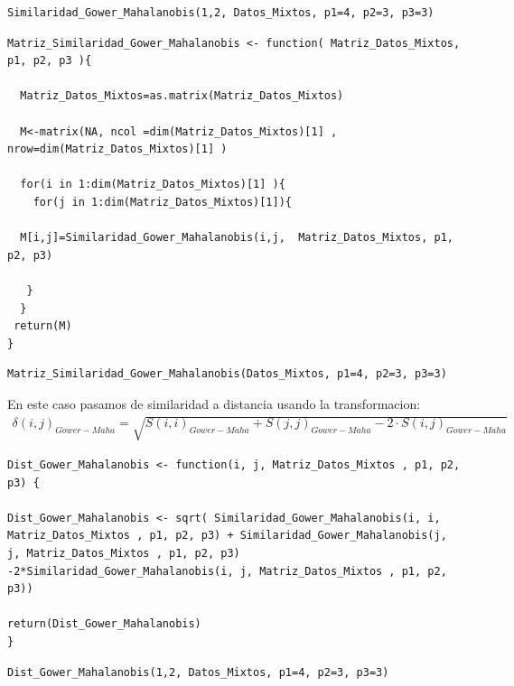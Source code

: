\documentclass[12pt]{report} %
\begin{document}
 
\vspace{1cm}
 

\begin{lstlisting}
Similaridad_Gower_Mahalanobis(1,2, Datos_Mixtos, p1=4, p2=3, p3=3)
\end{lstlisting}


\begin{lstlisting}
Matriz_Similaridad_Gower_Mahalanobis <- function( Matriz_Datos_Mixtos, p1, p2, p3 ){
  
  Matriz_Datos_Mixtos=as.matrix(Matriz_Datos_Mixtos)
  
  M<-matrix(NA, ncol =dim(Matriz_Datos_Mixtos)[1] , nrow=dim(Matriz_Datos_Mixtos)[1] )
  
  for(i in 1:dim(Matriz_Datos_Mixtos)[1] ){
    for(j in 1:dim(Matriz_Datos_Mixtos)[1]){
    
  M[i,j]=Similaridad_Gower_Mahalanobis(i,j,  Matriz_Datos_Mixtos, p1, p2, p3)
  
   }
  }
 return(M)
}
\end{lstlisting}



\begin{lstlisting}
Matriz_Similaridad_Gower_Mahalanobis(Datos_Mixtos, p1=4, p2=3, p3=3)
\end{lstlisting}




\newpage
 
En este caso pasamos de similaridad a distancia usando la transformacion: 
\begin{gather*}
 \delta(i,j)_{Gower-Maha}= \sqrt{ S(i, i)_{Gower-Maha} + S(j, j)_{Gower-Maha} - 2\cdot S(i,j)_{Gower-Maha} }
\end{gather*} 



\begin{lstlisting}
Dist_Gower_Mahalanobis <- function(i, j, Matriz_Datos_Mixtos , p1, p2, p3) {

Dist_Gower_Mahalanobis <- sqrt( Similaridad_Gower_Mahalanobis(i, i, Matriz_Datos_Mixtos , p1, p2, p3) + Similaridad_Gower_Mahalanobis(j, j, Matriz_Datos_Mixtos , p1, p2, p3) -2*Similaridad_Gower_Mahalanobis(i, j, Matriz_Datos_Mixtos , p1, p2, p3))

return(Dist_Gower_Mahalanobis)
}

\end{lstlisting}

\begin{lstlisting}
Dist_Gower_Mahalanobis(1,2, Datos_Mixtos, p1=4, p2=3, p3=3)
\end{lstlisting}
 
\end{document}
